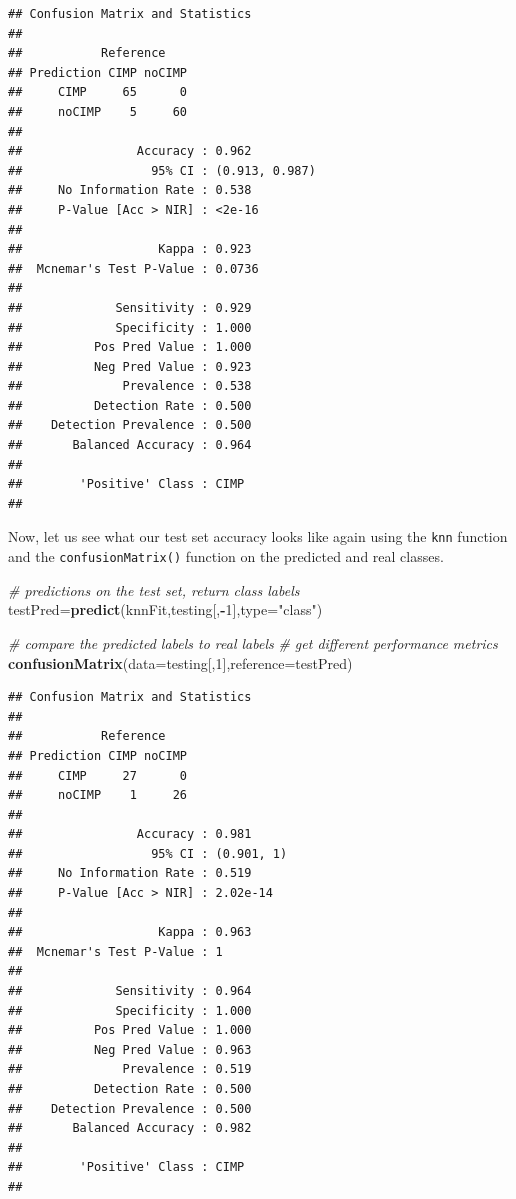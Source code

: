 \documentclass[12pt,]{krantz}
\newenvironment{Shaded}{\begin{snugshade}}{\end{snugshade}}
\newcommand{\CommentTok}[1]{\textcolor[rgb]{0.56,0.35,0.01}{\textit{#1}}}
\newcommand{\DataTypeTok}[1]{\textcolor[rgb]{0.13,0.29,0.53}{#1}}
\newcommand{\DecValTok}[1]{\textcolor[rgb]{0.00,0.00,0.81}{#1}}
\newcommand{\KeywordTok}[1]{\textcolor[rgb]{0.13,0.29,0.53}{\textbf{#1}}}
\newcommand{\NormalTok}[1]{#1}
\newcommand{\OperatorTok}[1]{\textcolor[rgb]{0.81,0.36,0.00}{\textbf{#1}}}
\newcommand{\StringTok}[1]{\textcolor[rgb]{0.31,0.60,0.02}{#1}}
\begin{document}
\begin{verbatim}
## Confusion Matrix and Statistics
## 
##           Reference
## Prediction CIMP noCIMP
##     CIMP     65      0
##     noCIMP    5     60
##                                         
##                Accuracy : 0.962         
##                  95% CI : (0.913, 0.987)
##     No Information Rate : 0.538         
##     P-Value [Acc > NIR] : <2e-16        
##                                         
##                   Kappa : 0.923         
##  Mcnemar's Test P-Value : 0.0736        
##                                         
##             Sensitivity : 0.929         
##             Specificity : 1.000         
##          Pos Pred Value : 1.000         
##          Neg Pred Value : 0.923         
##              Prevalence : 0.538         
##          Detection Rate : 0.500         
##    Detection Prevalence : 0.500         
##       Balanced Accuracy : 0.964         
##                                         
##        'Positive' Class : CIMP          
## 
\end{verbatim}

Now, let us see what our test set accuracy looks like again using the \texttt{knn} function and the \texttt{confusionMatrix()} function on the predicted and real classes.

\begin{Shaded}
\begin{Highlighting}[]
\CommentTok{# predictions on the test set, return class labels}
\NormalTok{testPred=}\KeywordTok{predict}\NormalTok{(knnFit,testing[,}\OperatorTok{-}\DecValTok{1}\NormalTok{],}\DataTypeTok{type=}\StringTok{"class"}\NormalTok{)}

\CommentTok{# compare the predicted labels to real labels}
\CommentTok{# get different performance metrics}
\KeywordTok{confusionMatrix}\NormalTok{(}\DataTypeTok{data=}\NormalTok{testing[,}\DecValTok{1}\NormalTok{],}\DataTypeTok{reference=}\NormalTok{testPred)}
\end{Highlighting}
\end{Shaded}

\begin{verbatim}
## Confusion Matrix and Statistics
## 
##           Reference
## Prediction CIMP noCIMP
##     CIMP     27      0
##     noCIMP    1     26
##                                     
##                Accuracy : 0.981     
##                  95% CI : (0.901, 1)
##     No Information Rate : 0.519     
##     P-Value [Acc > NIR] : 2.02e-14  
##                                     
##                   Kappa : 0.963     
##  Mcnemar's Test P-Value : 1         
##                                     
##             Sensitivity : 0.964     
##             Specificity : 1.000     
##          Pos Pred Value : 1.000     
##          Neg Pred Value : 0.963     
##              Prevalence : 0.519     
##          Detection Rate : 0.500     
##    Detection Prevalence : 0.500     
##       Balanced Accuracy : 0.982     
##                                     
##        'Positive' Class : CIMP      
## 
\end{verbatim}
\end{document}
